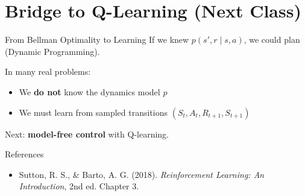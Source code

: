 \documentclass[11pt]{beamer}
\begin{document}
\section{Bridge to Q-Learning (Next Class)}

\begin{frame}{From Bellman Optimality to Learning}
If we knew $p(s',r\mid s,a)$, we could plan (Dynamic Programming).

\vspace{6pt}
In many real problems:
\begin{itemize}
  \item We \textbf{do not} know the dynamics model $p$
  \item We must learn from sampled transitions $(S_t,A_t,R_{t+1},S_{t+1})$
\end{itemize}

\vspace{6pt}
Next: \textbf{model-free control} with Q-learning.
\end{frame}

\begin{frame}{References}
\begin{itemize}
  \item Sutton, R. S., \& Barto, A. G. (2018). \textit{Reinforcement Learning: An Introduction}, 2nd ed. Chapter 3.
\end{itemize}
\end{frame}
\end{document}
